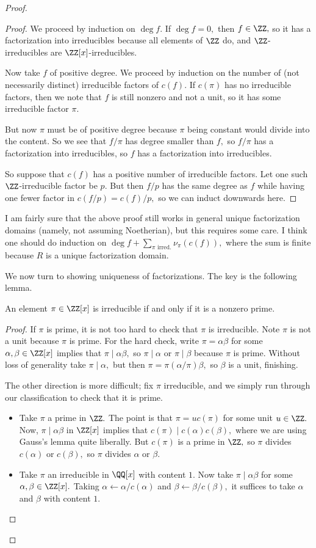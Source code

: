 \documentclass[../notes.tex]{subfiles}
\begin{document}
\begin{proof}
\begin{proof}
		We proceed by induction on $\deg f.$ If $\deg f=0,$ then $f\in\ZZ,$ so it has a factorization into irreducibles because all elements of $\ZZ$ do, and $\ZZ$-irreducibles are $\ZZ[x]$-irreducibles.

		Now take $f$ of positive degree. We proceed by induction on the number of (not necessarily distinct) irreducible factors of $c(f).$	
		If $c(\pi)$ has no irreducible factors, then we note that $f$ is still nonzero and not a unit, so it has some irreducible factor $\pi.$
		
		But now $\pi$ must be of positive degree because $\pi$ being constant would divide into the content. So we see that $f/\pi$ has degree smaller than $f,$ so $f/\pi$ has a factorization into irreducibles, so $f$ has a factorization into irreducibles.

		So suppose that $c(f)$ has a positive number of irreducible factors. Let one such $\ZZ$-irreducible factor be $p.$ But then $f/p$ has the same degree as $f$ while having one fewer factor in $c(f/p)=c(f)/p,$ so we can induct downwards here.
	\end{proof}
	\begin{remark}[Nir]
		I am fairly sure that the above proof still works in general unique factorization domains (namely, not assuming Noetherian), but this requires some care. I think one should do induction on $\deg f+\sum_{\pi\text{ irred.}}\nu_\pi(c(f)),$ where the sum is finite because $R$ is a unique factorization domain.
	\end{remark}
	We now turn to showing uniqueness of factorizations. The key is the following lemma.
	\begin{lemma}
		An element $\pi\in\ZZ[x]$ is irreducible if and only if it is a nonzero prime.
	\end{lemma}
	\begin{proof}
		If $\pi$ is prime, it is not too hard to check that $\pi$ is irreducible. Note $\pi$ is not a unit because $\pi$ is prime. For the hard check, write $\pi=\alpha\beta$ for some $\alpha,\beta\in\ZZ[x]$ implies that $\pi\mid\alpha\beta,$ so $\pi\mid\alpha$ or $\pi\mid\beta$ because $\pi$ is prime. Without loss of generality take $\pi\mid\alpha,$ but then $\pi=\pi(\alpha/\pi)\beta,$ so $\beta$ is a unit, finishing.

		The other direction is more difficult; fix $\pi$ irreducible, and we simply run through our classification to check that it is prime.
		\begin{itemize}
			\item Take $\pi$ a prime in $\ZZ.$ The point is that $\pi=uc(\pi)$ for some unit $u\in\ZZ.$ Now, $\pi\mid\alpha\beta$ in $\ZZ[x]$ implies that $c(\pi)\mid c(\alpha)c(\beta),$ where we are using Gauss's lemma quite liberally. But $c(\pi)$ is a prime in $\ZZ,$ so $\pi$ divides $c(\alpha)$ or $c(\beta),$ so $\pi$ divides $\alpha$ or $\beta.$
			\item Take $\pi$ an irreducible in $\QQ[x]$ with content $1.$ Now take $\pi\mid\alpha\beta$ for some $\alpha,\beta\in\ZZ[x].$ Taking $\alpha\leftarrow\alpha/c(\alpha)$ and $\beta\leftarrow\beta/c(\beta),$ it suffices to take $\alpha$ and $\beta$ with content $1.$
			

\end{itemize}
\end{proof}
\end{proof}
\end{document}
